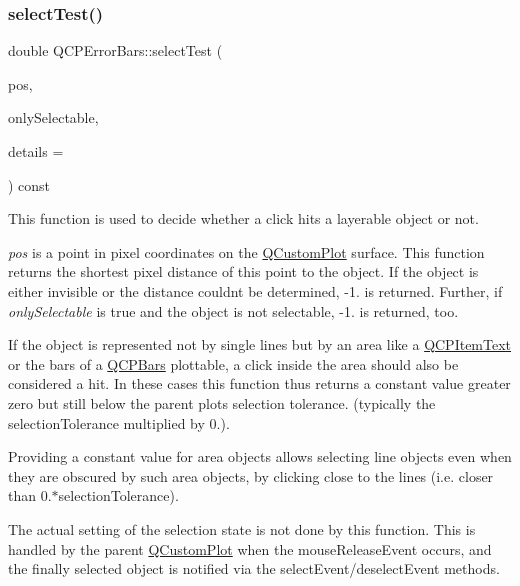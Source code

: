 \mbox{\label{class_q_c_p_error_bars_ac1b6675ef43e32547a3cbcf7b7ac46ed}} 
\subsubsection{\texorpdfstring{select\+Test()}{selectTest()}}
{\footnotesize\ttfamily double Q\+C\+P\+Error\+Bars\+::select\+Test (\begin{DoxyParamCaption}\item[{const Q\+PointF \&}]{pos,  }\item[{bool}]{only\+Selectable,  }\item[{Q\+Variant $\ast$}]{details = {} }\end{DoxyParamCaption}) const\hspace{0.3cm}{\ttfamily [virtual]}}

This function is used to decide whether a click hits a layerable object or not.

{\itshape pos} is a point in pixel coordinates on the \hyperlink{class_q_custom_plot}{Q\+Custom\+Plot} surface. This function returns the shortest pixel distance of this point to the object. If the object is either invisible or the distance couldn\textquotesingle{}t be determined, -\/1. is returned. Further, if {\itshape only\+Selectable} is true and the object is not selectable, -\/1. is returned, too.

If the object is represented not by single lines but by an area like a \hyperlink{class_q_c_p_item_text}{Q\+C\+P\+Item\+Text} or the bars of a \hyperlink{class_q_c_p_bars}{Q\+C\+P\+Bars} plottable, a click inside the area should also be considered a hit. In these cases this function thus returns a constant value greater zero but still below the parent plot\textquotesingle{}s selection tolerance. (typically the selection\+Tolerance multiplied by 0.).

Providing a constant value for area objects allows selecting line objects even when they are obscured by such area objects, by clicking close to the lines (i.\+e. closer than 0.$\ast$selection\+Tolerance).

The actual setting of the selection state is not done by this function. This is handled by the parent \hyperlink{class_q_custom_plot}{Q\+Custom\+Plot} when the mouse\+Release\+Event occurs, and the finally selected object is notified via the select\+Event/deselect\+Event methods.

